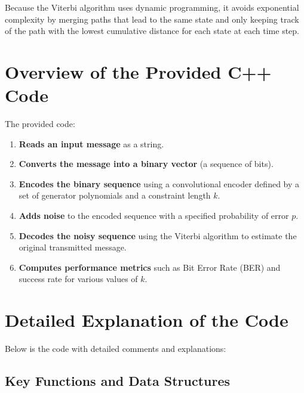 \documentclass[12pt,a4paper]{article}
\begin{document}
Because the Viterbi algorithm uses dynamic programming, it avoids exponential complexity by merging paths that lead to the same state and only keeping track of the path with the lowest cumulative distance for each state at each time step.

\section{Overview of the Provided C++ Code}

The provided code:
\begin{enumerate}
    \item \textbf{Reads an input message} as a string.
    \item \textbf{Converts the message into a binary vector} (a sequence of bits).
    \item \textbf{Encodes the binary sequence} using a convolutional encoder defined by a set of generator polynomials and a constraint length $k$.
    \item \textbf{Adds noise} to the encoded sequence with a specified probability of error $p$.
    \item \textbf{Decodes the noisy sequence} using the Viterbi algorithm to estimate the original transmitted message.
    \item \textbf{Computes performance metrics} such as Bit Error Rate (BER) and success rate for various values of $k$.
\end{enumerate}

\section{Detailed Explanation of the Code}

Below is the code with detailed comments and explanations:




\subsection{Key Functions and Data Structures}
\end{document}
